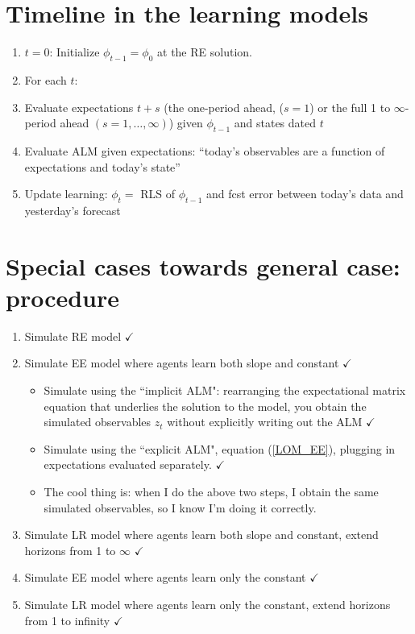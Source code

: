 \documentclass[11pt]{article}
\renewcommand{\[}{\begin{equation}}
\renewcommand{\]}{\end{equation}}
\begin{document}
\section{Timeline in the learning models}
\begin{enumerate}
\item[] \underline{$t=0$}: Initialize $\phi_{t-1} = \phi_0$ at the RE solution.
\item[] For each $t$:
\item Evaluate expectations $t+s$ (the one-period ahead, ($s=1$) or the full 1 to $\infty$-period ahead $(s=1,\dots, \infty)$) given $\phi_{t-1}$ and states dated $t$
\item Evaluate ALM given expectations: ``today's observables are a function of expectations and today's state''
\item Update learning: $\phi_t = $ RLS of $\phi_{t-1}$ and fcst error between today's data and yesterday's forecast
\end{enumerate}

\section{Special cases towards general case: procedure}
\begin{enumerate}
\item Simulate RE model $\checkmark$
\item Simulate EE model where agents learn both slope and constant $\checkmark$
	\begin{itemize}
	\item Simulate using the ``implicit ALM": rearranging the expectational matrix equation that underlies the solution to the model, you obtain the simulated observables $z_t$ without explicitly writing out the ALM $\checkmark$
	\item Simulate using the ``explicit ALM", equation (\ref{LOM_EE}), plugging in expectations evaluated separately. $\checkmark$
	\item[] The cool thing is: when I do the above two steps, I obtain the same simulated observables, so I know I'm doing it correctly.
 	\end{itemize}
\item Simulate LR model where agents learn both slope and constant, extend horizons from 1 to $\infty$ $\checkmark$
\item Simulate EE model where agents learn only the constant $\checkmark$
\item Simulate LR model where agents learn only the constant, extend horizons from 1 to infinity $\checkmark$
\end{enumerate}
\end{document}
